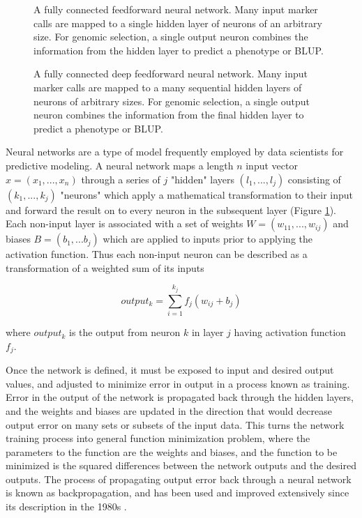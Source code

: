 \documentclass[9pt,twocolumn,twoside]{g3_article/gsag3jnl}
\begin{document}
\begin{figure}[htbp]
\renewcommand{\familydefault}{\sfdefault}\normalfont
\centering

\caption{A fully connected feedforward neural network. Many input marker calls are mapped 
to a single hidden layer of neurons of an arbitrary size. For genomic selection, a single output
neuron combines the information from the hidden layer to predict a phenotype or BLUP.}%
\label{fig:simplenet}
\end{figure}

\begin{figure}[htbp]
\renewcommand{\familydefault}{\sfdefault}\normalfont
\centering

\caption{A fully connected deep feedforward neural network. Many input marker calls are mapped 
to a many sequential hidden layers of neurons of arbitrary sizes. For genomic selection, a single output
neuron combines the information from the final hidden layer to predict a phenotype or BLUP.}%
\label{fig:deepnet}
\end{figure}


Neural networks are a type of model frequently employed by data scientists
for predictive modeling. A neural network maps a length $n$ input vector $x = (x_1, ..., x_n)$
through a series of $j$ "hidden" layers $(l_1, ..., l_j)$ consisting of $(k_1, ..., k_j)$ "neurons" 
which apply a mathematical transformation to their input and forward the 
result on to every neuron in the subsequent layer (Figure \ref{fig:simplenet}). 
Each non-input layer is associated with a set of weights $W = (w_{11}, ..., w_{ij})$
and biases $B = (b_1, ... b_j)$ which are applied to inputs prior to applying the
activation function. Thus each non-input neuron can be described as a transformation
of a weighted sum of its inputs

\begin{equation}
    output_k = \sum_{i=1}^{k_{j}} f_j(w_{ij} + b_j)
\label{eq:neuron}
\end{equation}

where $output_k$ is the output from neuron $k$ in layer $j$ having activation
function $f_j$.

Once the network is defined, it must be exposed to input and desired output
values, and adjusted to minimize error in output in a process known as training.
Error in the output of the network is propagated back through the hidden 
layers, and the weights and biases are updated in the direction that would 
decrease output error on many sets or subsets of the input data. 
This turns the network training process into general 
function minimization problem, where the parameters to the function are the 
weights and biases, and the function to be minimized is the squared differences 
between the network outputs and the desired outputs. The process of 
propagating output error back through a neural network is known as 
backpropagation, and has been used and improved extensively since its 
description in the 1980s \citep{rumelhart1986}. 
\end{document}
